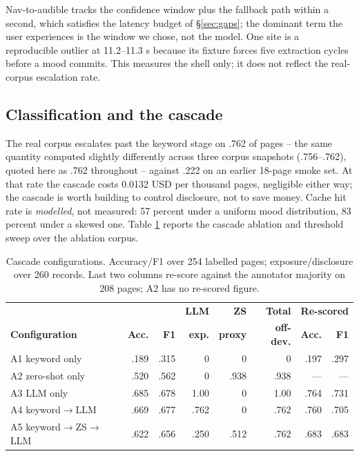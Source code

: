 \documentclass[conference]{IEEEtran}
\let\IEEEoriginalcaption\caption
\renewcommand{\caption}[1]{\IEEEoriginalcaption{\footnotesize #1}}
\begin{document}
Nav-to-audible tracks the confidence window plus the fallback path within
a second, which satisfies the latency budget of \S\ref{sec:gaps}; the
dominant term the user experiences is the window we chose, not the model.
One site is a reproducible outlier at 11.2--11.3 s because its fixture
forces five extraction cycles before a mood commits. This measures the
shell only; it does not reflect the real-corpus escalation rate.

\subsection{Classification and the cascade}
\label{sec:res-classification}
\label{sec:res-cost}

The real corpus escalates past the keyword stage on .762 of pages -- the
same quantity computed slightly differently across three corpus
snapshots (.756--.762), quoted here as .762 throughout -- against .222 on
an earlier 18-page smoke set. At that rate the cascade costs 0.0132 USD
per thousand pages, negligible either way; the cascade is worth building
to control disclosure, not to save money. Cache hit rate is
\emph{modelled}, not measured: 57 percent under a uniform mood
distribution, 83 percent under a skewed one. Table \ref{tab:tiers}
reports the cascade ablation and threshold sweep over the ablation
corpus.

\begin{table}[t]
\caption{Cascade configurations. Accuracy/F1 over 254 labelled pages;
exposure/disclosure over 260 records. Last two columns re-score against
the annotator majority on 208 pages; A2 has no re-scored figure.}
\label{tab:tiers}
\begin{center}
\scriptsize
\setlength{\tabcolsep}{2.5pt}
\begin{tabular}{lrrrrrrr}
\toprule
& & & \textbf{LLM} & \textbf{ZS} & \textbf{Total} & \multicolumn{2}{c}{\textbf{Re-scored}} \\
\textbf{Configuration} & \textbf{Acc.} & \textbf{F1} & \textbf{exp.} & \textbf{proxy} & \textbf{off-dev.} & \textbf{Acc.} & \textbf{F1} \\
\midrule
A1 keyword only & .189 & .315 & 0 & 0 & 0 & .197 & .297 \\
A2 zero-shot only & .520 & .562 & 0 & .938 & .938 & --- & --- \\
A3 LLM only & .685 & .678 & 1.00 & 0 & 1.00 & .764 & .731 \\
A4 keyword$\to$LLM & .669 & .677 & .762 & 0 & .762 & .760 & .705 \\
A5 keyword$\to$ZS$\to$LLM & .622 & .656 & .250 & .512 & .762 & .683 & .683 \\
\bottomrule
\end{tabular}
\end{center}
\end{table}
\end{document}
